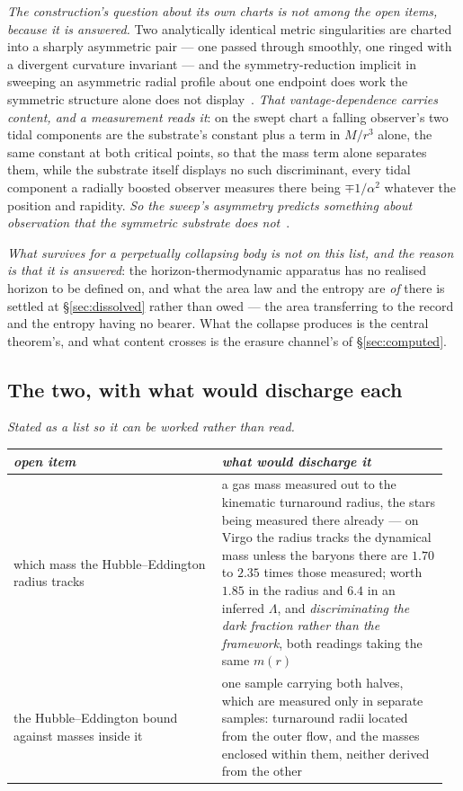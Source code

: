\documentclass[11pt,a4paper]{article}
\theoremstyle{plain}
\theoremstyle{definition}
\begin{document}
\emph{The construction's question about its own charts is not among the open items, because it is
answered.} Two analytically identical metric singularities are charted into a sharply asymmetric pair --- one
passed through smoothly, one ringed with a divergent curvature invariant --- and the symmetry-reduction implicit
in sweeping an asymmetric radial profile about one endpoint does work the symmetric structure alone does not
display~\cite{JanzenCircle}. \emph{That vantage-dependence carries content, and a measurement reads it}: on the
swept chart a falling observer's two tidal components are the substrate's constant plus a term in $M/r^{3}$
alone, the same constant at both critical points, so that the mass term alone separates them, while the substrate itself displays no such discriminant,
every tidal component a radially boosted observer measures there being $\mp1/\alpha^{2}$ whatever the position
and rapidity. \emph{So the sweep's asymmetry predicts something about observation that the symmetric substrate
does not}~\cite{JanzenCRframework}.

\emph{What survives for a perpetually collapsing body is not on this list, and the reason is that it is
answered}: the horizon-thermodynamic apparatus has no realised horizon to be defined on, and what the area
law and the entropy are \emph{of} there is settled at \S\ref{sec:dissolved} rather than owed --- the area
transferring to the record and the entropy having no bearer. What the collapse produces is the central
theorem's, and what content crosses is the erasure channel's of \S\ref{sec:computed}.

\subsection{The two, with what would discharge each}

\emph{Stated as a list so it can be worked rather than read.}

\begin{small}
\noindent\begin{tabular}{@{}p{0.46\linewidth}p{0.50\linewidth}@{}}
\hline
\emph{open item} & \emph{what would discharge it}\\
\hline
which mass the Hubble--Eddington radius tracks & a gas mass measured out to the kinematic turnaround radius, the stars being measured there already --- on Virgo the radius tracks the dynamical mass unless the baryons there are $1.70$ to $2.35$ times those measured; worth $1.85$ in the radius and $6.4$ in an inferred $\Lambda$, and \emph{discriminating the dark fraction rather than the framework}, both readings taking the same $m(r)$\\
the Hubble--Eddington bound against masses inside it & one sample carrying both halves, which are measured only in separate samples: turnaround radii located from the outer flow, and the masses enclosed within them, neither derived from the other\\
\hline
\end{tabular}
\end{small}
\end{document}
